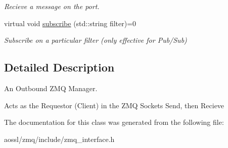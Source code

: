 \begin{DoxyCompactItemize}
\begin{DoxyCompactList}\small\item\em Recieve a message on the port. \end{DoxyCompactList}\item 
virtual void \hyperlink{classZmqOut_a1183a7e64e76deaa0262cb1fc7853af5}{subscribe} (std\+::string filter)=0\hypertarget{classZmqOut_a1183a7e64e76deaa0262cb1fc7853af5}{}\label{classZmqOut_a1183a7e64e76deaa0262cb1fc7853af5}

\begin{DoxyCompactList}\small\item\em Subscribe on a particular filter (only effective for Pub/\+Sub) \end{DoxyCompactList}\end{DoxyCompactItemize}


\subsection{Detailed Description}
An Outbound Z\+MQ Manager. 

Acts as the Requestor (Client) in the Z\+MQ Sockets Send, then Recieve 

The documentation for this class was generated from the following file\+:\begin{DoxyCompactItemize}
\item 
aossl/zmq/include/zmq\+\_\+interface.\+h\end{DoxyCompactItemize}
